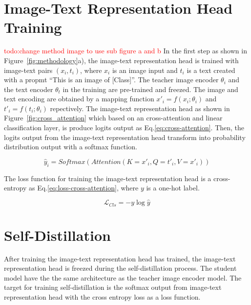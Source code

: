 \section{Image-Text Representation Head Training}
\textcolor{red}{todo:change method image to use sub figure a and b}
In the first step as shown in Figure~\ref{fig:methodology}a), the image-text representation head is trained with image-text pairs $(x_i, t_i)$, where $x_i$ is an image input and $t_i$ is a text created with a propmt ``This is an image of [Class]''.
The teacher image encoder $\theta_i$ and the text encoder $\theta_t$ in the training are pre-trained and freezed.
The image and text encoding are obtained by a mapping function $x'_i = f(x_i; \theta_i)$ and $t'_i = f(t_i; \theta_i)$ repectively. 
The image-text representation head as shown in Figure~\ref{fig:cross_attention} which based on an cross-attention and linear classification layer, is produce logits output as Eq.\ref{eq:cross-attention}.
Then, the logits output from the image-text representation head transform into probability distribution output with a softmax function.

\begin{equation} 
    \label{eq:cross-attention}
    \hat{y}_i = Softmax(Attention(K=x'_i, Q=t'_i, V=x'_i))
\end{equation}

The loss function for training the image-text representation head is a cross-entropy as Eq.\ref{eq:loss-cross-attention}, where $y$ is a one-hot label.

\begin{equation}
    \label{eq:loss-cross-attention}
    \mathcal{L}_{Cls} = -y\log\hat{y}
\end{equation}



\section{Self-Distillation}
After training the image-text representation head has trained, the image-text representation head is freezed during the self-distillation process.
The student model have the the same architecture as the teacher image encoder model.
The target for training self-distillation is the softmax output from image-text representation head with the cross entropy loss as a loss function.



